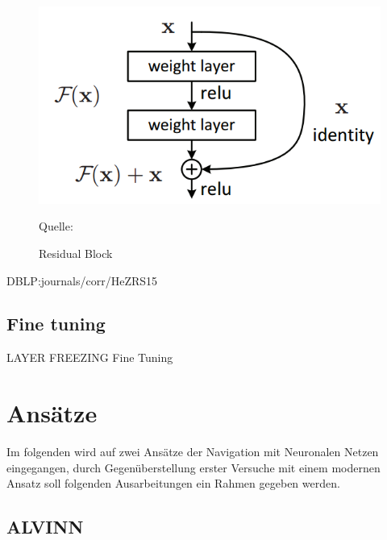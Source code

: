 \begin{figure}
	\centering
	\includegraphics[scale=0.5]{figures/ResidualBlock.png}
	\caption{Residual Block}
	Quelle: 
	\label{img:ResBlock}
\end{figure}


DBLP:journals/corr/HeZRS15

\subsection{Fine tuning}
LAYER FREEZING 
Fine Tuning 









\section{Ansätze}
Im folgenden wird auf zwei Ansätze der Navigation mit Neuronalen Netzen eingegangen, durch Gegenüberstellung erster Versuche mit einem modernen Ansatz soll folgenden Ausarbeitungen ein Rahmen gegeben werden.

\subsection{ALVINN}

